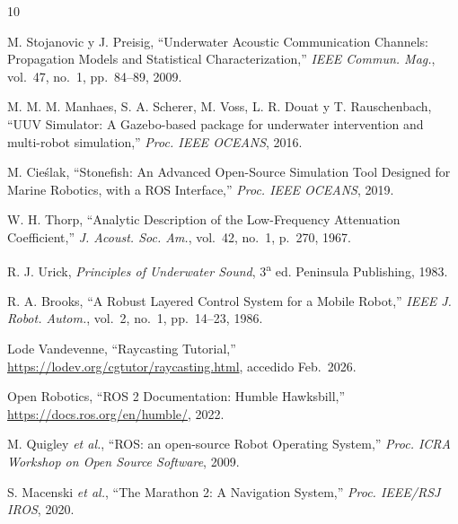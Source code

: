 \documentclass[10pt,twocolumn,letterpaper]{article}
\begin{document}
\begin{thebibliography}{10}

M. Stojanovic y J. Preisig,
``Underwater Acoustic Communication Channels: Propagation Models and Statistical Characterization,''
\textit{IEEE Commun. Mag.}, vol.~47, no.~1, pp.~84--89, 2009.

M. M. M. Manhaes, S. A. Scherer, M. Voss, L. R. Douat y T. Rauschenbach,
``UUV Simulator: A Gazebo-based package for underwater intervention and multi-robot simulation,''
\textit{Proc. IEEE OCEANS}, 2016.

M. Cieślak,
``Stonefish: An Advanced Open-Source Simulation Tool Designed for Marine Robotics, with a ROS Interface,''
\textit{Proc. IEEE OCEANS}, 2019.

W. H. Thorp,
``Analytic Description of the Low-Frequency Attenuation Coefficient,''
\textit{J. Acoust. Soc. Am.}, vol.~42, no.~1, p.~270, 1967.

R. J. Urick,
\textit{Principles of Underwater Sound}, 3\textsuperscript{a} ed.
Peninsula Publishing, 1983.

R. A. Brooks,
``A Robust Layered Control System for a Mobile Robot,''
\textit{IEEE J. Robot. Autom.}, vol.~2, no.~1, pp.~14--23, 1986.

Lode Vandevenne,
``Raycasting Tutorial,''
\url{https://lodev.org/cgtutor/raycasting.html}, accedido Feb.~2026.

Open Robotics,
``ROS 2 Documentation: Humble Hawksbill,''
\url{https://docs.ros.org/en/humble/}, 2022.

M. Quigley \textit{et al.},
``ROS: an open-source Robot Operating System,''
\textit{Proc. ICRA Workshop on Open Source Software}, 2009.

S. Macenski \textit{et al.},
``The Marathon 2: A Navigation System,''
\textit{Proc. IEEE/RSJ IROS}, 2020.

\end{thebibliography}
\end{document}
